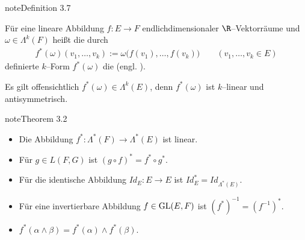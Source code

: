 \documentclass[letterpaper,10pt,english]{jupyterBook}
\begin{document}
\label{vektoranalysis/multilinear:pull-back von $\omega$ mit $f$.}
\begin{sphinxadmonition}{note}{Definition 3.7}



\sphinxAtStartPar
Für eine lineare Abbildung \(f:E\to F\) endlichdimensionaler \(\R\)–Vektorräume und \(\omega\in\Lambda^k(F)\) heißt die durch
\begin{equation*}
\begin{split}f^*(\omega)( v_1,\ldots, v_k) := \omega \big(f( v_1),\ldots,f( v_k)\big)
\qquad (v_1,\ldots,v_k\in E)\end{split}
\end{equation*}
\sphinxAtStartPar
definierte \(k\)–Form \(f^*(\omega)\) die  (engl.
).
\end{sphinxadmonition}

\sphinxAtStartPar
Es gilt offensichtlich \(f^*(\omega)\in\Lambda^k(E)\), denn \(f^*(\omega)\)
ist \(k\)–linear und antisymmetrisch.
\label{vektoranalysis/multilinear:theorem-24}
\begin{sphinxadmonition}{note}{Theorem 3.2}


\begin{itemize}
\item {} 
\sphinxAtStartPar
Die Abbildung \(f^*:\Lambda^*(F)\to\Lambda^*(E)\) ist linear.

\item {} 
\sphinxAtStartPar
Für \(g\in L(F,G)\) ist \((g\circ f)^*=f^*\circ g^*\).

\item {} 
\sphinxAtStartPar
Für die identische Abbildung \(Id_E:E\to E\) ist \(Id_E^* = Id_{\Lambda^*(E)}\).

\item {} 
\sphinxAtStartPar
Für eine invertierbare Abbildung \(f\in {\rm GL}(E,F)\) ist \((f^*)^{-1}=(f^{-1})^*\).

\item {} 
\sphinxAtStartPar
\(f^*(\alpha\wedge\beta) = f^*(\alpha)\wedge f^*(\beta)\).

\end{itemize}
\end{sphinxadmonition}
\end{document}
